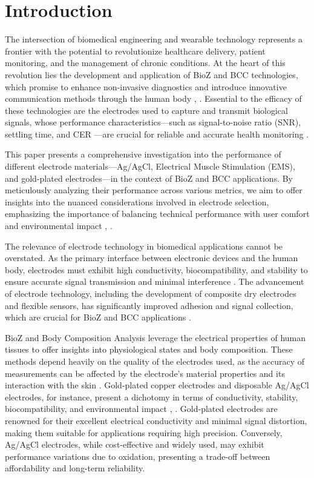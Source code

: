 \section{Introduction}
{
    The intersection of biomedical engineering and wearable technology represents a frontier with the potential to revolutionize healthcare delivery, patient monitoring, and the management of chronic conditions. At the heart of this revolution lies the development and application of \gls{BioZ}   and \gls{BCC}  technologies, which promise to enhance non-invasive diagnostics and introduce innovative communication methods through the human body \cite{Grimnes2000bioimpedance}, \cite{Tallgren2005Evaluation}. Essential to the efficacy of these technologies are the electrodes used to capture and transmit biological signals, whose performance characteristics—such as signal-to-noise ratio (SNR), settling time, and \gls{CER} —are crucial for reliable and accurate health monitoring \cite{ormanis2020towards}.

    This paper presents a comprehensive investigation into the performance of different electrode materials—Ag/AgCl, Electrical Muscle Stimulation (EMS), and gold-plated electrodes—in the context of \gls{BioZ}  and BCC applications. By meticulously analyzing their performance across various metrics, we aim to offer insights into the nuanced considerations involved in electrode selection, emphasizing the importance of balancing technical performance with user comfort and environmental impact \cite{Zen2004Amino}, \cite{NunezBajo2017Integration}.
    
    The relevance of electrode technology in biomedical applications cannot be overstated. As the primary interface between electronic devices and the human body, electrodes must exhibit high conductivity, biocompatibility, and stability to ensure accurate signal transmission and minimal interference \cite{lee2021recent}. The advancement of electrode technology, including the development of composite dry electrodes and flexible sensors, has significantly improved adhesion and signal collection, which are crucial for \gls{BioZ}  and BCC applications \cite{rabbani2023low}.
    
    \gls{BioZ}  and Body Composition Analysis  leverage the electrical properties of human tissues to offer insights into physiological states and body composition. These methods depend heavily on the quality of the electrodes used, as the accuracy of measurements can be affected by the electrode's material properties and its interaction with the skin \cite{s23094251}. Gold-plated copper electrodes and disposable Ag/AgCl electrodes, for instance, present a dichotomy in terms of conductivity, stability, biocompatibility, and environmental impact \cite{Zhao2018Fabrication}, \cite{Almeida2014On-site}. Gold-plated electrodes are renowned for their excellent electrical conductivity and minimal signal distortion, making them suitable for applications requiring high precision. Conversely, Ag/AgCl electrodes, while cost-effective and widely used, may exhibit performance variations due to oxidation, presenting a trade-off between affordability and long-term reliability.
    
}
